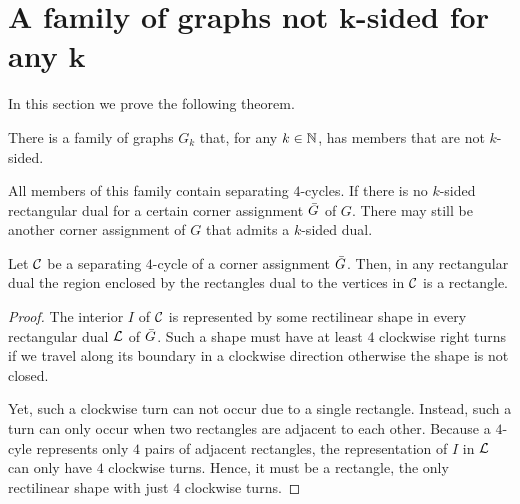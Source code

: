 
\section{A family of graphs not $\mathbf{k}$-sided for any $\mathbf{k}$}
\thispagestyle{plain}
  \label{s:fix}
  In this section we prove the following theorem.

  \begin{thrm}
    \label{fix:th:family}
      There is a family of graphs $G_k$ that, for any $k \in \mathbb{N}$, has members that are not $k$-sided.
  \end{thrm}

  All members of this family contain separating $4$-cycles.
  If there is no $k$-sided rectangular dual for a certain corner assignment $\bar{G}$ of $G$. There may still be another corner assignment of $G$ that admits a $k$-sided dual.

  \begin{lemma}
    \label{lm:interiorRectangle}
    Let $\mathcal{C}$ be a separating $4$-cycle of a corner assignment $\bar{G}$. Then, in any rectangular dual the region enclosed by the rectangles dual to the vertices in $\mathcal{C}$ is a rectangle.
  \end{lemma}
  \begin{proof}
    The interior $I$ of $\mathcal{C}$ is represented by some rectilinear shape in every rectangular dual $\mathcal{L}$ of $\bar{G}$. Such a shape must have at least $4$ clockwise right turns if we travel along its boundary in a clockwise direction otherwise the shape is not closed.

    Yet, such a clockwise turn can not occur due to a single rectangle. Instead, such a turn can only occur when two rectangles are adjacent to each other. Because a $4$-cyle represents only $4$ pairs of adjacent rectangles, the representation of $I$ in $\mathcal{L}$ can only have $4$ clockwise turns. Hence, it must be a rectangle, the only rectilinear shape with just $4$ clockwise turns.
  \end{proof}

